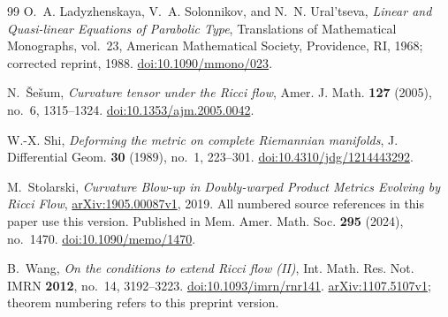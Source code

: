 \begin{thebibliography}{99}
O.~A. Ladyzhenskaya, V.~A. Solonnikov, and N.~N. Ural'tseva,
\emph{Linear and Quasi-linear Equations of Parabolic Type},
Translations of Mathematical Monographs, vol.~23,
American Mathematical Society, Providence, RI, 1968;
corrected reprint, 1988.
\href{https://doi.org/10.1090/mmono/023}{doi:10.1090/mmono/023}.

N.~\v{S}e\v{s}um,
\emph{Curvature tensor under the Ricci flow},
Amer. J. Math. \textbf{127} (2005), no.~6, 1315--1324.
\href{https://doi.org/10.1353/ajm.2005.0042}{doi:10.1353/ajm.2005.0042}.

W.-X. Shi,
\emph{Deforming the metric on complete Riemannian manifolds},
J. Differential Geom. \textbf{30} (1989), no.~1, 223--301.
\href{https://doi.org/10.4310/jdg/1214443292}{doi:10.4310/jdg/1214443292}.

M.~Stolarski,
\emph{Curvature Blow-up in Doubly-warped Product Metrics Evolving by Ricci Flow},
\href{https://arxiv.org/abs/1905.00087v1}{arXiv:1905.00087v1}, 2019.
All numbered source references in this paper use this version.
Published in Mem. Amer. Math. Soc. \textbf{295} (2024), no.~1470.
\href{https://doi.org/10.1090/memo/1470}{doi:10.1090/memo/1470}.

B.~Wang,
\emph{On the conditions to extend Ricci flow (II)},
Int. Math. Res. Not. IMRN \textbf{2012}, no.~14, 3192--3223.
\href{https://doi.org/10.1093/imrn/rnr141}{doi:10.1093/imrn/rnr141}.
\href{https://arxiv.org/abs/1107.5107v1}{arXiv:1107.5107v1};
theorem numbering refers to this preprint version.

\end{thebibliography}
